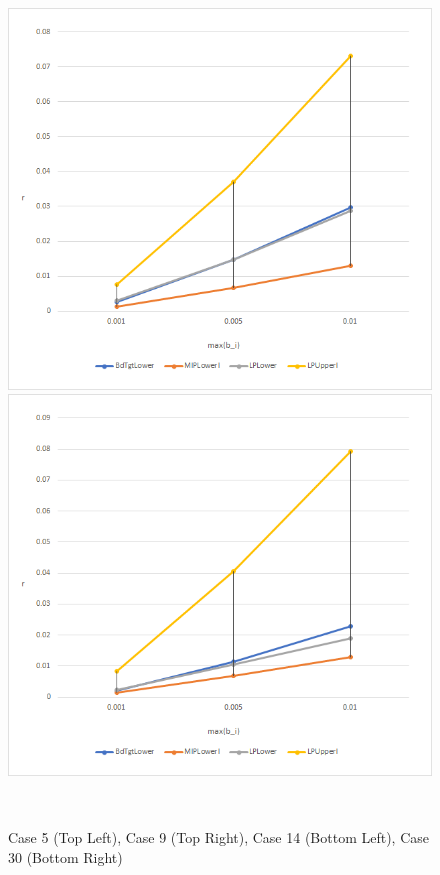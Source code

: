\begin{figure}[h]
\begin{center}
\includegraphics[scale=0.45]{Figures/Case14}
\includegraphics[scale=0.45]{Figures/Case30}
\caption{Case 5 (Top Left), Case 9 (Top Right), Case 14 (Bottom Left), Case 30 (Bottom Right)} \ \\
\end{center}
\label{fig:Graphs1}
\end{figure} 

